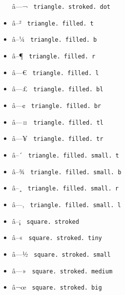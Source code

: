 \begin{itemize}
  \label{symbol-triangle.stroked.dot}{{ â---¬ }
  \texttt{\ triangle.\ stroked.\ dot\ }}
\item
  \label{symbol-triangle.filled.t}{{ â--² }
  \texttt{\ triangle.\ filled.\ t\ }}
\item
  \label{symbol-triangle.filled.b}{{ â--¼ }
  \texttt{\ triangle.\ filled.\ b\ }}
\item
  \label{symbol-triangle.filled.r}{{ â--¶ }
  \texttt{\ triangle.\ filled.\ r\ }}
\item
  \label{symbol-triangle.filled.l}{{ â---€ }
  \texttt{\ triangle.\ filled.\ l\ }}
\item
  \label{symbol-triangle.filled.bl}{{ â---£ }
  \texttt{\ triangle.\ filled.\ bl\ }}
\item
  \label{symbol-triangle.filled.br}{{ â---¢ }
  \texttt{\ triangle.\ filled.\ br\ }}
\item
  \label{symbol-triangle.filled.tl}{{ â---¤ }
  \texttt{\ triangle.\ filled.\ tl\ }}
\item
  \label{symbol-triangle.filled.tr}{{ â---¥ }
  \texttt{\ triangle.\ filled.\ tr\ }}
\item
  \label{symbol-triangle.filled.small.t}{{ â--´ }
  \texttt{\ triangle.\ filled.\ small.\ t\ }}
\item
  \label{symbol-triangle.filled.small.b}{{ â--¾ }
  \texttt{\ triangle.\ filled.\ small.\ b\ }}
\item
  \label{symbol-triangle.filled.small.r}{{ â--¸ }
  \texttt{\ triangle.\ filled.\ small.\ r\ }}
\item
  \label{symbol-triangle.filled.small.l}{{ â---‚ }
  \texttt{\ triangle.\ filled.\ small.\ l\ }}
\item
  \label{symbol-square.stroked}{{ â--¡ }
  \texttt{\ square.\ stroked\ }}
\item
  \label{symbol-square.stroked.tiny}{{ â--« }
  \texttt{\ square.\ stroked.\ tiny\ }}
\item
  \label{symbol-square.stroked.small}{{ â---½ }
  \texttt{\ square.\ stroked.\ small\ }}
\item
  \label{symbol-square.stroked.medium}{{ â---» }
  \texttt{\ square.\ stroked.\ medium\ }}
\item
  \label{symbol-square.stroked.big}{{ â¬œ }
  \texttt{\ square.\ stroked.\ big\ }}

\end{itemize}
